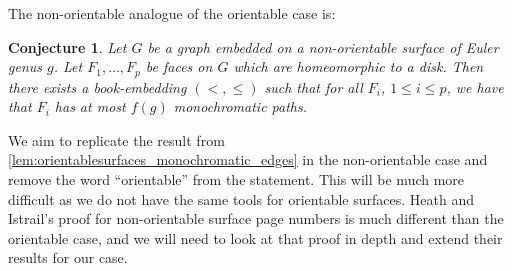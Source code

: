 \documentclass[notitlepage]{report}
\newtheorem{conjecture}[theorem]{Conjecture}
\theoremstyle{definition}
\numberwithin{theorem}{section}
\numberwithin{equation}{section}
\begin{document}
The non-orientable analogue of the orientable case is:
\begin{conjecture}
	Let $G$ be a graph embedded on a non-orientable surface of Euler genus $g$. Let $F_1, \ldots, F_p$ be faces on $G$ which are homeomorphic to a disk. Then there exists a book-embedding $(<, \leq)$ such that for all $F_i$, $1 \leq i \leq p$, we have that $F_i$ has at most $f(g)$ monochromatic paths.
\end{conjecture}
We aim to replicate the result from \cref{lem:orientablesurfaces_monochromatic_edges} in the non-orientable case and remove the word ``orientable'' from the statement.
This will be much more difficult as we do not have the same tools for orientable surfaces. Heath and Istrail's proof for non-orientable surface page numbers is much different than the orientable case, and we will need to look at that proof in depth and extend their results for our case.

\printbibliography{}
\end{document}
